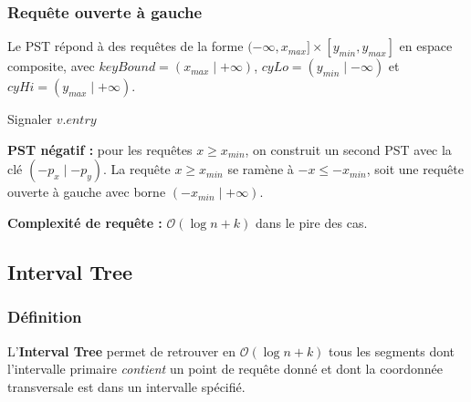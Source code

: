 \documentclass[11pt,a4paper]{article}
\begin{document}
\subsubsection{Requête ouverte à gauche}

Le PST répond à des requêtes de la forme $(-\infty, x_{max}] \times [y_{min}, y_{max}]$ en espace composite, avec $keyBound = (x_{max} \mid +\infty)$, $cyLo = (y_{min} \mid -\infty)$ et $cyHi = (y_{max} \mid +\infty)$.

\begin{algorithm}[H]
\caption{Requête ouverte à gauche sur le PST}
\begin{algorithmic}[1]
     \Return \EndIf
        \Return {}
    \EndIf
        \State Signaler $v.entry$
    \EndIf
        \State {}
    \EndIf
        \State {}
    \EndIf
\EndProcedure
\end{algorithmic}
\end{algorithm}

\textbf{PST négatif :} pour les requêtes $x \geq x_{min}$, on construit un second PST avec la clé $(-p_x \mid -p_y)$. La requête $x \geq x_{min}$ se ramène à $-x \leq -x_{min}$, soit une requête ouverte à gauche avec borne $(-x_{min} \mid +\infty)$.

\textbf{Complexité de requête :} $\mathcal{O}(\log n + k)$ dans le pire des cas.

\subsection{Interval Tree}

\subsubsection{Définition}

L'\textbf{Interval Tree} permet de retrouver en $\mathcal{O}(\log n + k)$ tous les segments dont l'intervalle primaire \emph{contient} un point de requête donné et dont la coordonnée transversale est dans un intervalle spécifié.
\end{document}
